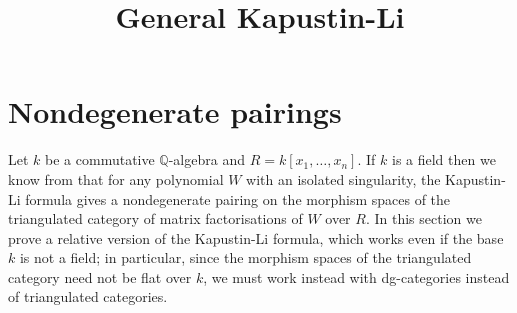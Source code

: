 \documentclass{compositio}
\theoremstyle{definition}
\numberwithin{equation}{section}
\def\Res{\res\!}
\def\res{\operatorname{Res}}
\begin{document}
\def\Res{\res\!}
\newcommand{\cat}[1]{\mathcal{#1}}
\newcommand{\lto}{\longrightarrow}
\newcommand{\xlto}[1]{\stackrel{#1}\lto}
\newcommand{\mf}[1]{\mathfrak{#1}}
\newcommand{\md}[1]{\mathscr{#1}}
\newcommand{\intvar}{\bs{x}_{\textup{int}}}
\newcommand{\extvar}{\bs{x}_{\textup{ext}}}
\newcommand{\qderu}[2]{\mathbf{D}^{#1}(#2)}
\newcommand{\ud}{\mathrm{d}}
\def\l{\,|\,}
\def\cf{\boldsymbol{cf}}
\def\bx{\boldsymbol{x}}
\def\by{\boldsymbol{y}}
\def\ba{\boldsymbol{a}}
\def\bb{\boldsymbol{b}}
\def\totimes{\otimes}
\def\di{Q}
\newcommand{\cotimes}[1]{\,\widehat{\otimes}_{#1}\,}
\def\QQ{\mathds{Q}}
\def\krc{C}
\def\diffm{d}
\def\diffh{d_{\chi}}
\def\redh{\overline{H}}
\def\ZZ{\mathds{Z}}
\def\bs{\boldsymbol}
\def\Ztwo{\mathds{Z}_2}
\def\mdual{^{\vee}}
\def\KR{\operatorname{KR}}
\def\I{\!\operatorname{i}\!}
\def\E{\operatorname{e}\!}
\def\sln{\mathfrak{sl}(N)}
\def\nN{\mathds{N}}
\def\nZ{\mathds{Z}}
\def\nQ{\mathds{Q}}
\def\nR{\mathds{R}}
\def\nC{\mathds{C}}
\def\Bar{\mathds{B}}
\def\cBar{\widehat{\mathds{B}}}
\def\Ae{A^{\operatorname{e}}}

\title{General Kapustin-Li}

\maketitle

\section{Nondegenerate pairings}

Let $k$ be a commutative $\mathbb{Q}$-algebra and $R = k[x_1,\ldots,x_n]$. If $k$ is a field then we know from \cite{??,??} that for any polynomial $W$ with an isolated singularity, the Kapustin-Li formula gives a nondegenerate pairing on the morphism spaces of the triangulated category of matrix factorisations of $W$ over $R$. In this section we prove a relative version of the Kapustin-Li formula, which works even if the base $k$ is not a field; in particular, since the morphism spaces of the triangulated category need not be flat over $k$, we must work instead with dg-categories instead of triangulated categories.
\end{document}
